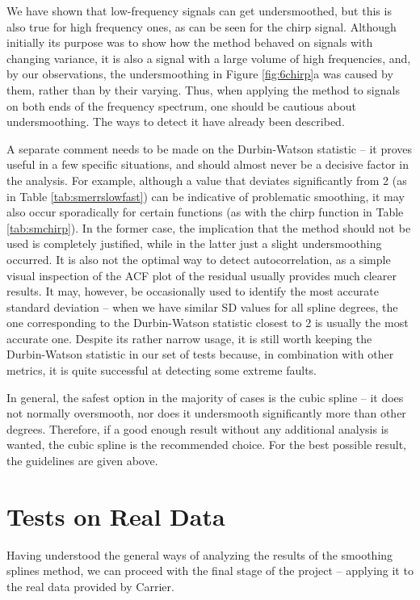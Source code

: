 \documentclass[11pt,leqno]{book}
\theoremstyle{definition}
\theoremstyle{plain}
\theoremstyle{definition}
\begin{document}
{We have shown that low-frequency signals can get undersmoothed, but this is also true for high frequency ones, as can be seen for the chirp signal. Although initially its purpose was to show how the method behaved on signals with changing variance, it is also a signal with a large volume of high frequencies, and, by our observations, the undersmoothing in Figure \ref{fig:6chirp}a was caused by them, rather than by their varying. Thus, when applying the method to signals on both ends of the frequency spectrum, one should be cautious about undersmoothing. The ways to detect it have already been described.

A separate comment needs to be made on the Durbin-Watson statistic -- it proves useful in a few specific situations, and should almost never be a decisive factor in the analysis. For example, although a value that deviates significantly from 2 (as in Table \ref{tab:smerrslowfast}) can be indicative of problematic smoothing, it may also occur sporadically for certain functions (as with the chirp function in Table \ref{tab:smchirp}). In the former case, the implication that the method should not be used is completely justified, while in the latter just a slight undersmoothing occurred. It is also not the optimal way to detect autocorrelation, as a simple visual inspection of the ACF plot of the residual usually provides much clearer results. It may, however, be occasionally used to identify the most accurate standard deviation -- when we have similar SD values for all spline degrees, the one corresponding to the Durbin-Watson statistic closest to 2 is usually the most accurate one. Despite its rather narrow usage, it is still worth keeping the Durbin-Watson statistic in our set of tests because, in combination with other metrics, it is quite successful at detecting some extreme faults.

In general, the safest option in the majority of cases is the cubic spline -- it does not normally oversmooth, nor does it undersmooth significantly more than other degrees. Therefore, if a good enough result without any additional analysis is wanted, the cubic spline is the recommended choice. For the best possible result, the guidelines are given above. 
\chapter{Tests on Real Data}
Having understood the general ways of analyzing the results of the smoothing splines method, we can proceed with the final stage of the project -- applying it to the real data provided by Carrier.
}
\end{document}
